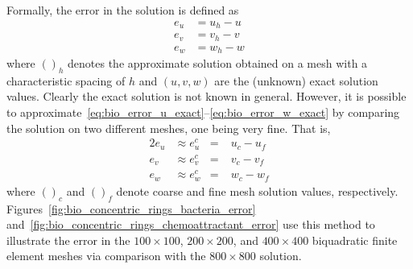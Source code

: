   Formally, the error in the solution is defined as
\begin{align}
  e_u & = u_h  - u \label{eq:bio_error_u_exact} \\
  e_v & = v_h  - v \label{eq:bio_error_v_exact} \\
  e_w & = w_h  - w \label{eq:bio_error_w_exact}  
\end{align}
where $()_h$ denotes the approximate solution obtained on a mesh with a characteristic spacing of $h$ and $(u,v,w)$ are the (unknown) exact solution values.  Clearly the exact solution is not known in general.  However, it is possible to approximate~\eqref{eq:bio_error_u_exact}--\eqref{eq:bio_error_w_exact} by comparing the solution on two different meshes, one being very fine.  That is,
\begin{alignat}{2}
  e_u &\approx e^c_u & = &\; u_c  - u_f \label{eq:bio_error_u_approx} \\
  e_v &\approx e^c_v & = &\; v_c  - v_f \label{eq:bio_error_v_approx} \\
  e_w &\approx e^c_w & = &\; w_c  - w_f \label{eq:bio_error_w_approx}  
\end{alignat}
where $()_c$ and $()_f$ denote coarse and fine mesh solution values, respectively. Figures~\ref{fig:bio_concentric_rings_bacteria_error} and~\ref{fig:bio_concentric_rings_chemoattractant_error} use this method to illustrate the error in the $100\times 100$, $200\times 200$, and $400\times 400$ biquadratic finite element meshes via comparison with the $800\times 800$ solution. 

